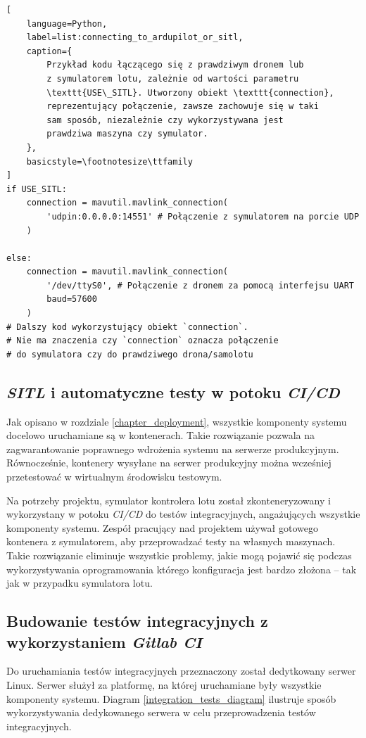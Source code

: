 \begin{lstlisting}[
    language=Python,
    label=list:connecting_to_ardupilot_or_sitl,
    caption={
        Przykład kodu łączącego się z prawdziwym dronem lub 
        z symulatorem lotu, zależnie od wartości parametru
        \texttt{USE\_SITL}. Utworzony obiekt \texttt{connection},
        reprezentujący połączenie, zawsze zachowuje się w taki
        sam sposób, niezależnie czy wykorzystywana jest
        prawdziwa maszyna czy symulator. 
    },
    basicstyle=\footnotesize\ttfamily
]
if USE_SITL:
    connection = mavutil.mavlink_connection(
        'udpin:0.0.0.0:14551' # Połączenie z symulatorem na porcie UDP
    )

else:    
    connection = mavutil.mavlink_connection(
        '/dev/ttyS0', # Połączenie z dronem za pomocą interfejsu UART
        baud=57600
    )
# Dalszy kod wykorzystujący obiekt `connection`.
# Nie ma znaczenia czy `connection` oznacza połączenie
# do symulatora czy do prawdziwego drona/samolotu
\end{lstlisting}

\subsection{\textit{SITL} i automatyczne testy w potoku \textit{CI/CD}}

Jak opisano w rozdziale \ref{chapter_deployment}, wszystkie komponenty systemu
docelowo uruchamiane są w kontenerach. Takie rozwiązanie pozwala na zagwarantowanie
poprawnego wdrożenia systemu na serwerze produkcyjnym. Równocześnie, kontenery wysyłane
na serwer produkcyjny można wcześniej przetestować w wirtualnym środowisku testowym.

Na potrzeby projektu, symulator kontrolera lotu został zkonteneryzowany i wykorzystany
w potoku \textit{CI/CD} do testów integracyjnych, angażujących wszystkie komponenty systemu.
Zespół pracujący nad projektem używał gotowego kontenera z symulatorem,
aby przeprowadzać testy na własnych maszynach. Takie rozwiązanie eliminuje wszystkie
problemy, jakie mogą pojawić się podczas wykorzystywania oprogramowania którego
konfiguracja jest bardzo złożona -- tak jak w przypadku symulatora lotu.

\subsection{Budowanie testów integracyjnych z wykorzystaniem \textit{Gitlab CI}}

Do uruchamiania testów integracyjnych przeznaczony został dedytkowany serwer
Linux. Serwer służył za platformę, na której uruchamiane były wszystkie 
komponenty systemu. Diagram \ref{integration_tests_diagram} ilustruje 
sposób wykorzystywania dedykowanego serwera w celu przeprowadzenia 
testów integracyjnych.

